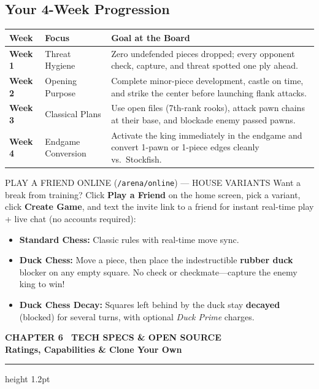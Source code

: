 \documentclass[10pt,twoside]{article}
\newcommand{\manualsection}[2]{%
  \vspace{2pt}
  {\noindent\sffamily\bfseries\scriptsize\textcolor{brand}{#1}}\\[3pt]
  {\noindent\Large\bfseries\textcolor{ink}{#2}}\\[3pt]
  {\color{ink}\hrule height 1.2pt}
  \vspace{4pt}
}
\begin{document}
\subsection*{\sffamily\small\textcolor{brand}{Your 4-Week Progression}}
\scriptsize
\begin{tabularx}{\textwidth}{@{}llX@{}}
\toprule
\textbf{\sffamily Week} & \textbf{\sffamily Focus} & \textbf{\sffamily Goal at the Board} \\
\midrule
\textbf{Week 1} & Threat Hygiene & Zero undefended pieces dropped; every opponent check, capture, and threat spotted one ply ahead. \\
\textbf{Week 2} & Opening Purpose & Complete minor-piece development, castle on time, and strike the center before launching flank attacks. \\
\textbf{Week 3} & Classical Plans & Use open files (7th-rank rooks), attack pawn chains at their base, and blockade enemy passed pawns. \\
\textbf{Week 4} & Endgame Conversion & Activate the king immediately in the endgame and convert 1-pawn or 1-piece edges cleanly vs.\ Stockfish. \\
\bottomrule
\end{tabularx}

\vspace{4pt}
\begin{manualbox}{PLAY A FRIEND ONLINE (\texttt{/arena/online}) --- HOUSE VARIANTS}
\scriptsize
Want a break from training? Click \textbf{Play a Friend} on the home screen, pick a variant, click \textbf{Create Game}, and text the invite link to a friend for instant real-time play + live chat (no accounts required):
\begin{itemize}[leftmargin=12pt, itemsep=1.5pt, topsep=1pt]
  \item \textbf{Standard Chess:} Classic rules with real-time move sync.
  \item \textbf{Duck Chess:} Move a piece, then place the indestructible \textbf{rubber duck} blocker on any empty square. No check or checkmate---capture the enemy king to win!
  \item \textbf{Duck Chess Decay:} Squares left behind by the duck stay \textbf{decayed} (blocked) for several turns, with optional \emph{Duck Prime} charges.
\end{itemize}
\end{manualbox}
\normalsize

\newpage

\manualsection{CHAPTER 6 \textbar\ TECH SPECS \& OPEN SOURCE}{Ratings, Capabilities \& Clone Your Own}
\end{document}
